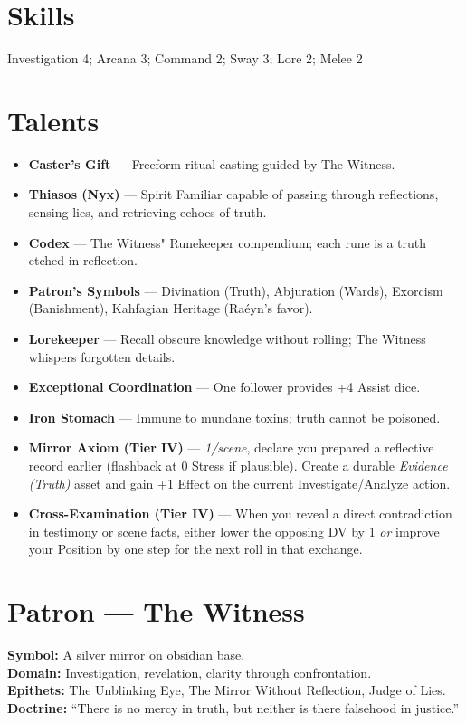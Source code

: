 \documentclass[11pt]{article}
\begin{document}
\section*{Skills}
Investigation 4; Arcana 3; Command 2; Sway 3; Lore 2; Melee 2

\section*{Talents}
\begin{itemize}
  \item \textbf{Caster's Gift} --- Freeform ritual casting guided by The Witness.
  \item \textbf{Thiasos (Nyx)} --- Spirit Familiar capable of passing through reflections, sensing lies, and retrieving echoes of truth.
  \item \textbf{Codex} --- The Witness" Runekeeper compendium; each rune is a truth etched in reflection.
  \item \textbf{Patron's Symbols} --- Divination (Truth), Abjuration (Wards), Exorcism (Banishment), Kahfagian Heritage (Raéyn's favor).
  \item \textbf{Lorekeeper} --- Recall obscure knowledge without rolling; The Witness whispers forgotten details.
  \item \textbf{Exceptional Coordination} --- One follower provides +4 Assist dice.
  \item \textbf{Iron Stomach} --- Immune to mundane toxins; truth cannot be poisoned.
  \item \textbf{Mirror Axiom (Tier IV)} --- \emph{1/scene}, declare you prepared a reflective record earlier (flashback at 0 Stress if plausible). Create a durable \emph{Evidence (Truth)} asset and gain +1 Effect on the current Investigate/Analyze action.
  \item \textbf{Cross-Examination (Tier IV)} --- When you reveal a direct contradiction in testimony or scene facts, either lower the opposing DV by 1 \emph{or} improve your Position by one step for the next roll in that exchange.
\end{itemize}

\section*{Patron --- The Witness}
\textbf{Symbol:} A silver mirror on obsidian base.\\
\textbf{Domain:} Investigation, revelation, clarity through confrontation.\\
\textbf{Epithets:} The Unblinking Eye, The Mirror Without Reflection, Judge of Lies.\\
\textbf{Doctrine:} ``There is no mercy in truth, but neither is there falsehood in justice.''\\[6pt]
\end{document}
